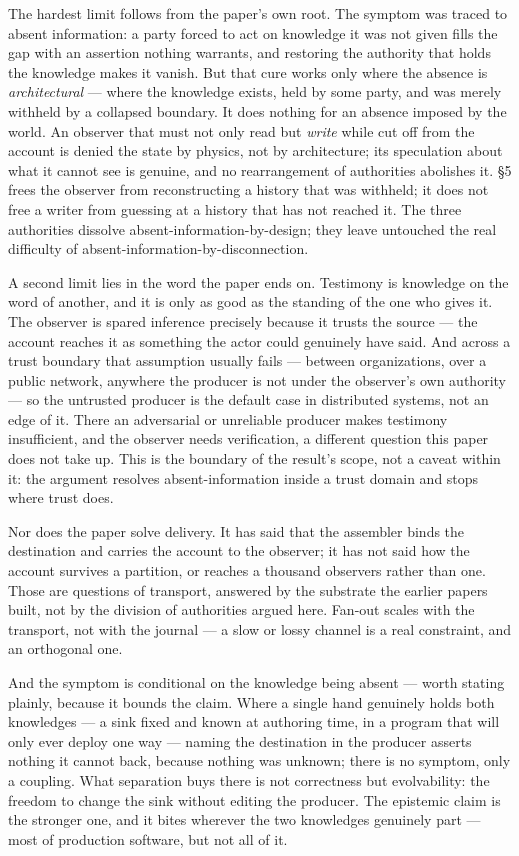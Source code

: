 \documentclass[
]{article}
\begin{document}
The hardest limit follows from the paper's own root. The symptom was
traced to absent information: a party forced to act on knowledge it was
not given fills the gap with an assertion nothing warrants, and
restoring the authority that holds the knowledge makes it vanish. But
that cure works only where the absence is \emph{architectural} --- where
the knowledge exists, held by some party, and was merely withheld by a
collapsed boundary. It does nothing for an absence imposed by the world.
An observer that must not only read but \emph{write} while cut off from
the account is denied the state by physics, not by architecture; its
speculation about what it cannot see is genuine, and no rearrangement of
authorities abolishes it. §5 frees the observer from reconstructing a
history that was withheld; it does not free a writer from guessing at a
history that has not reached it. The three authorities dissolve
absent-information-by-design; they leave untouched the real difficulty
of absent-information-by-disconnection.

A second limit lies in the word the paper ends on. Testimony is
knowledge on the word of another, and it is only as good as the standing
of the one who gives it. The observer is spared inference precisely
because it trusts the source --- the account reaches it as something the
actor could genuinely have said. And across a trust boundary that
assumption usually fails --- between organizations, over a public
network, anywhere the producer is not under the observer's own authority
--- so the untrusted producer is the default case in distributed
systems, not an edge of it. There an adversarial or unreliable producer
makes testimony insufficient, and the observer needs verification, a
different question this paper does not take up. This is the boundary of
the result's scope, not a caveat within it: the argument resolves
absent-information inside a trust domain and stops where trust does.

Nor does the paper solve delivery. It has said that the assembler binds
the destination and carries the account to the observer; it has not said
how the account survives a partition, or reaches a thousand observers
rather than one. Those are questions of transport, answered by the
substrate the earlier papers built, not by the division of authorities
argued here. Fan-out scales with the transport, not with the journal ---
a slow or lossy channel is a real constraint, and an orthogonal one.

And the symptom is conditional on the knowledge being absent --- worth
stating plainly, because it bounds the claim. Where a single hand
genuinely holds both knowledges --- a sink fixed and known at authoring
time, in a program that will only ever deploy one way --- naming the
destination in the producer asserts nothing it cannot back, because
nothing was unknown; there is no symptom, only a coupling. What
separation buys there is not correctness but evolvability: the freedom
to change the sink without editing the producer. The epistemic claim is
the stronger one, and it bites wherever the two knowledges genuinely
part --- most of production software, but not all of it.
\end{document}
